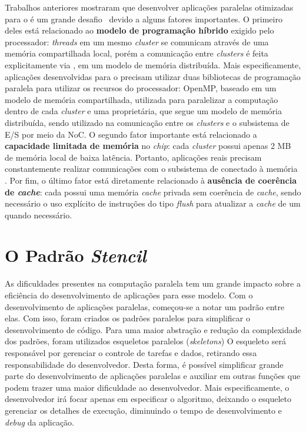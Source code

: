 Trabalhos anteriores mostraram que desenvolver aplicações paralelas otimizadas
para o \mppa é um grande desafio~\cite{Castro-IA3-JPDC:2014} devido a alguns
fatores importantes. O primeiro deles está relacionado ao \textbf{modelo de
    programação híbrido} exigido pelo processador: \textit{threads} em um mesmo
\textit{cluster} se comunicam através de uma memória compartilhada local, porém
a comunicação entre \textit{clusters} é feita explicitamente via \noc, em um
modelo de memória distribuída. Mais especificamente, aplicações desenvolvidas
para o \mppa precisam utilizar duas bibliotecas de programação paralela para
utilizar os recursos do processador: OpenMP, baseado em um modelo de memória
compartilhada, utilizada para paralelizar a computação dentro de cada
\textit{cluster} e uma \api proprietária, que segue um modelo de memória
distribuída, sendo utilizado na comunicação entre os \textit{clusters} e o
subsistema de E/S por meio da NoC. O segundo fator importante está relacionado a
\textbf{capacidade limitada de memória} no \textit{chip}: cada \textit{cluster}
possui apenas 2 MB de memória local de baixa latência. Portanto, aplicações
reais precisam constantemente realizar comunicações com o subsistema de \io
conectado à memória \lpddr. Por fim, o último fator está diretamente relacionado
à \textbf{ausência de coerência de \textit{cache}}: cada \pe possui uma memória
\textit{cache} privada sem coerência de \textit{cache}, sendo necessário o uso
explícito de instruções do tipo \textit{flush} para atualizar a \textit{cache}
de um \pe quando necessário.


\section{O Padrão \textit{Stencil}}

As dificuldades presentes na computação paralela tem um grande impacto sobre a
eficiência do desenvolvimento de aplicações para esse modelo. Com o
desenvolvimento de aplicações paralelas, começou-se a notar um padrão entre
elas. Com isso, foram criados os padrões paralelos para simplificar o
desenvolvimento de código.
Para uma maior abstração e redução da complexidade dos padrões, foram utilizados
esqueletos paralelos (\textit{skeletons}) O esqueleto será responsável por
gerenciar o controle de tarefas e dados, retirando essa responsabilidade do
desenvolvedor. Desta forma, é possível simplificar grande parte do
desenvolvimento de aplicações paralelas e auxiliar em outras funções que podem
trazer uma maior dificuldade ao desenvolvedor. Mais especificamente, o
desenvolvedor irá focar apenas em especificar o algoritmo, deixando o esqueleto
gerenciar os detalhes de execução, diminuindo o tempo de desenvolvimento e
\textit{debug} da aplicação.

